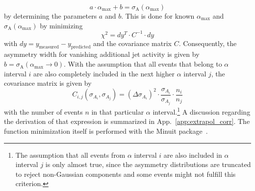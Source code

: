 \begin{equation}
 a \cdot \alpha_\mathrm{max} + b = \sigma_\mathrm{A}(\alpha_\mathrm{max})
\end{equation}
by determining the parameters $a$ and $b$. This is done for known $\alpha_\mathrm{max}$ and $\sigma_\mathrm{A}(\alpha_\mathrm{max})$ by minimizing 
\begin{equation}
\chi^2 = dy^T \cdot C^{-1} \cdot dy
\end{equation}
with $dy = y_{\mathrm{measured}} - y_{\mathrm{predicted}}$ and the covariance matrix $C$. Consequently, the asymmetry width for vanishing additional jet activity is given by $b=\sigma_\mathrm{A}(\alpha_\mathrm{max} \rightarrow 0)$. With the assumption that all events that belong to $\alpha$ interval $i$ are also completely included in the next higher $\alpha$ interval $j$, the covariance matrix is given by
\begin{equation}
C_{i,j}(\sigma_{A_i},\sigma_{A_j}) = (\Delta \sigma_{A_i})^2 \cdot \frac{\sigma_{A_i}}{\sigma_{A_j}} \cdot \frac{n_i}{n_j} 
\label{eq:jer_corr}
\end{equation}
with the number of events $n$ in that particular $\alpha$ interval.\footnote{The assumption that all events from $\alpha$ interval $i$ are also included in $\alpha$ interval $j$ is only almost true, since the asymmetry distributions are truncated to reject non-Gaussian components and some events might not fulfill this criterion.} A discussion regarding the derivation of that expression is summarized in App.~\ref{app:extrapol_corr}. The function minimization itself is performed with the Minuit package~\cite{Minuit}.   
